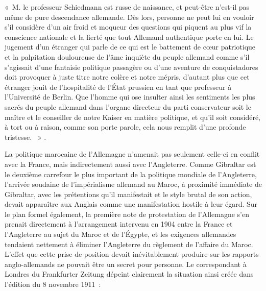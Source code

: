\documentclass[french,twoside]{book} %
\begin{document}
{ « M. le professeur Schiedmann est russe de naissance, et peut-être n’est-il pas même de pure descendance allemande. Dès lors, personne ne peut lui en vouloir s’il considère d’un air froid et moqueur des questions qui piquent au plus vif la conscience nationale et la fierté que tout Allemand authentique porte en lui. Le jugement d’un étranger qui parle de ce qui est le battement de cœur patriotique et la palpitation douloureuse de l’âme inquiète du peuple allemand comme s’il s’agissait d’une fantaisie politique passagère ou d’une aventure de conquistadores doit provoquer à juste titre notre colère et notre mépris, d’autant plus que cet étranger jouit de l’hospitalité de l’État prussien en tant que professeur à l’Université de Berlin. Que l’homme qui ose insulter ainsi les sentiments les plus sacrés du peuple allemand dans l’organe directeur du parti conservateur soit le maître et le conseiller de notre Kaiser en matière politique, et qu’il soit considéré, à tort ou à raison, comme son porte parole, cela nous remplit d’une profonde tristesse.  »
}.\par
La politique marocaine de l’Allemagne n’amenait pas seulement celle-ci en conflit avec la France, mais indirectement aussi avec l’Angleterre. Comme Gibraltar est le deuxième carrefour le plus important de la politique mondiale de l’Angleterre, l’arrivée soudaine de l’impérialisme allemand au Maroc, à proximité immédiate de Gibraltar, avec les prétentions qu’il manifestait et le style brutal de son action, devait apparaître aux Anglais comme une manifestation hostile à leur égard. Sur le plan formel également, la première note de protestation de l’Allemagne s’en prenait directement à l’arrangement intervenu en 1904 entre la France et l’Angleterre au sujet du Maroc et de l’Égypte, et les exigences allemandes tendaient nettement à éliminer l’Angleterre du règlement de l’affaire du Maroc. L'effet que cette prise de position devait inévitablement produire sur les rapports anglo-allemands ne pouvait être un secret pour personne. Le correspondant à Londres du Frankfurter Zeitung dépeint clairement la situation ainsi créée dans l’édition du 8 novembre 1911 :\par
\end{document}
